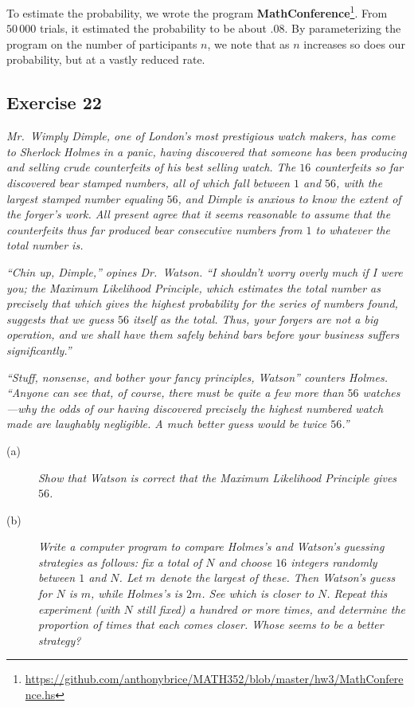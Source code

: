 \documentclass{tufte-handout}
\begin{document}
To estimate the probability, we wrote the program
\textbf{\mbox{MathConference}}\footnote{\url{https://github.com/anthonybrice/MATH352/blob/master/hw3/MathConference.hs}}. From
$50\,000$ trials, it estimated the probability to be about $.08$. By
parameterizing the program on the number of participants $n$, we note
that as $n$ increases so does our probability, but at a vastly reduced
rate.

\subsection{Exercise 22}
\begin{description}
\item \emph{Mr.~Wimply Dimple, one of London's most prestigious watch
    makers, has come to Sherlock Holmes in a panic, having discovered
    that someone has been producing and selling crude counterfeits of
    his best selling watch. The $16$ counterfeits so far discovered
    bear stamped numbers, all of which fall between $1$ and $56$, with
    the largest stamped number equaling $56$, and Dimple is anxious to
    know the extent of the forger's work. All present agree that it
    seems reasonable to assume that the counterfeits thus far produced
    bear consecutive numbers from $1$ to whatever the total number
    is.}

  \emph{``Chin up, Dimple,'' opines Dr.~Watson. ``I shouldn't worry
    overly much if I were you; the Maximum Likelihood Principle, which
    estimates the total number as precisely that which gives the
    highest probability for the series of numbers found, suggests that
    we guess $56$ itself as the total. Thus, your forgers are not a
    big operation, and we shall have them safely behind bars before
    your business suffers significantly.''}

  \emph{``Stuff, nonsense, and bother your fancy principles, Watson''
    counters Holmes. ``Anyone can see that, of course, there must be
    quite a few more than $56$ watches---why the odds of our having
    discovered precisely the highest numbered watch made are laughably
    negligible. A much better guess would be twice $56$.''}

  \begin{description}
  \item[(a)] \emph{Show that Watson is correct that the Maximum
      Likelihood Principle gives $56$.}
  \item[(b)] \emph{Write a computer program to compare Holmes's and
      Watson's guessing strategies as follows: fix a total of $N$ and
      choose $16$ integers randomly between $1$ and $N$. Let $m$
      denote the largest of these. Then Watson's guess for $N$ is $m$,
      while Holmes's is $2m$. See which is closer to $N$. Repeat this
      experiment (with $N$ still fixed) a hundred or more times, and
      determine the proportion of times that each comes closer. Whose
      seems to be a better strategy?}
  \end{description}
\end{description}
\end{document}
